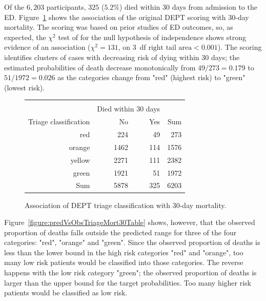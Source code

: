 Of the $6,203$ participants, $325$ ($5.2\%$) died within 30 days from admission to the ED.  Figure~\ref{figure:triageMort30Table} shows the association of the original DEPT scoring with 30-day mortality.   The scoring was based on prior studies of ED outcomes, so, as expected, the $\chi^2$ test of for the null hypothesis of independence shows strong evidence of an association ($\chi^2 = 131$, on 3~df $\text{right tail area} < 0.001$).  The scoring identifies clusters of cases with decreasing risk of dying within 30 days; the estimated probabilities of death decrease monotonically from $ 49/273 =  0.179$ to $ 51/1972 = 0.026$ as the categories change from "red" (highest risk) to "green" (lowest risk).

\begin{figure}[ht]
\centering
\begin{tabular}{rrrr}
  \hline \\
  & \multicolumn{2}{c}{Died within 30 days} & \\
Triage classification & No & Yes & Sum \\
  \hline
red & 224 & 49 & 273 \\
  orange & 1462 & 114 & 1576 \\
  yellow & 2271 & 111 & 2382 \\
  green & 1921 & 51 & 1972 \\
  Sum & 5878 & 325 & 6203 \\
   \hline
\end{tabular}
\caption{Association of DEPT triage classification with
       30-day mortality.}
\label{figure:triageMort30Table}
\end{figure}

Figure~\ref{figure:predVsObsTriageMort30Table} shows, however, that the observed proportion of deaths falls outside the predicted range for three of the four categories: "red", "orange" and "green".  Since the observed proportion of deaths is less than the lower bound in the high risk categories "red" and "orange", too many low risk patients would be classified into those categories.  The reverse happens with the low risk category "green"; the observed proportion of deaths is larger than the upper bound for the target probabilities.  Too many higher risk patients would be classified as low risk.


